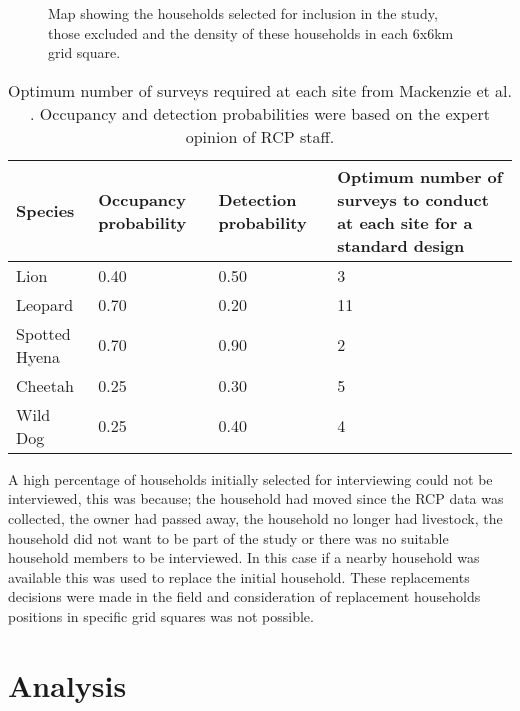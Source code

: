 \begin{figure}[h]
\centering
\setlength\fboxsep{0pt}
\setlength\fboxrule{0.5pt}
\caption{Map showing the households selected for inclusion in the study, those excluded and the density of these households in each 6x6km grid square.}
\label{fig:HH_selection}
\end{figure}

\begin{table}[h]
	\small
	\begin{center}
		\begin{tabular}{l p{3cm} p{3cm} p{5cm}}
			\hline \hline		
			Species 			& Occupancy probability	 	& Detection probability & Optimum number of surveys to conduct at each site for a standard design \cite{Mackenzie2005b}\\ \hline
			Lion 		& 0.40						& 0.50 & 3\\
			Leopard 	& 0.70						& 0.20 & 11\\
			Spotted 
			Hyena       & 0.70						& 0.90 & 2\\
			Cheetah 	& 0.25						& 0.30 & 5\\
			Wild Dog 	& 0.25						& 0.40 & 4\\
			\hline \hline						
		\end{tabular}
		\caption{Optimum number of surveys required at each site from Mackenzie et al. \cite{Mackenzie2005b}. Occupancy and detection probabilities were based on the expert opinion of RCP staff.}
	\label{table:OptimumRepeats}
	\end{center}
\end{table}

A high percentage of households initially selected for interviewing could not be interviewed, this was because; the household had moved since the RCP data was collected, the owner had passed away, the household no longer had livestock, the household did not want to be part of the study or there was no suitable household members to be interviewed. In this case if a nearby household was available this was used to replace the initial household. These replacements decisions were made in the field and consideration of replacement households positions in specific grid squares was not possible.

\section{Analysis}

